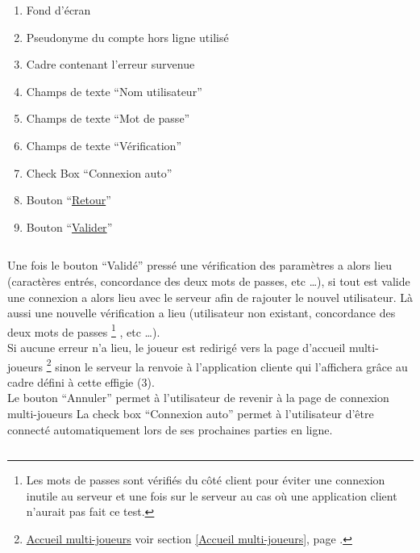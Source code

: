 \documentclass{report}
\begin{document}
		\hypertarget{Creation compte multi-joueurs}{}
		\label{Creation compte multi-joueurs}
	
		
		
		\begin{enumerate}
		  \item Fond d'écran
		  \item Pseudonyme du compte hors ligne utilisé
		  \item Cadre contenant l'erreur survenue
		  \item Champs de texte ``Nom utilisateur''
		  \item Champs de texte ``Mot de passe''
		  \item Champs de texte ``Vérification''
		  \item Check Box ``Connexion auto''
		  \item Bouton ``\hyperlink{Connexion multi-joueurs}{Retour}''
		  \item Bouton ``\hyperlink{Accueil multi-joueurs}{Valider}''
		\end{enumerate}
		
		$\,$
		
		Une fois le bouton ``Validé'' pressé une vérification des paramètres a alors
		lieu (caractères entrés, concordance des deux mots de passes, etc \ldots), si
		tout est valide une connexion a alors lieu avec le serveur afin de rajouter le
		nouvel utilisateur.
		Là aussi une nouvelle vérification a lieu (utilisateur non existant,
		concordance des deux mots de passes%
		\footnote[1]{
			Les mots de passes sont vérifiés du côté client pour éviter une connexion
			inutile au serveur et une fois sur le serveur au cas où une application
			client n'aurait pas fait ce test.
		}
		, etc \ldots).\\
		Si aucune erreur n'a lieu, le joueur est redirigé vers la page d'accueil
		multi-joueurs%
		\footnote[2]{
			\hyperlink{Accueil multi-joueurs}{Accueil multi-joueurs}
			\og voir section \ref{Accueil multi-joueurs}, page \pageref{Accueil multi-joueurs}.\fg
		}
		sinon le serveur la renvoie à l'application cliente qui l'affichera grâce au
		cadre défini à cette effigie (3).\\
		Le bouton ``Annuler'' permet à l'utilisateur de revenir à la page de connexion
		multi-joueurs
		\footnotemark[1]
		La check box ``Connexion auto'' permet à l'utilisateur d'être connecté
		automatiquement lors de ses prochaines parties en ligne.
				
		$\,$
	
\end{document}

